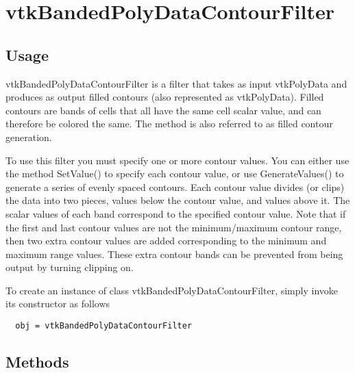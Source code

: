 \section{vtkBandedPolyDataContourFilter}

\subsection{Usage}

 vtkBandedPolyDataContourFilter is a filter that takes as input vtkPolyData
 and produces as output filled contours (also represented as vtkPolyData).
 Filled contours are bands of cells that all have the same cell scalar
 value, and can therefore be colored the same. The method is also referred
 to as filled contour generation.

 To use this filter you must specify one or more contour values.  You can
 either use the method SetValue() to specify each contour value, or use
 GenerateValues() to generate a series of evenly spaced contours.  Each
 contour value divides (or clips) the data into two pieces, values below
 the contour value, and values above it. The scalar values of each
 band correspond to the specified contour value.  Note that if the first and
 last contour values are not the minimum/maximum contour range, then two
 extra contour values are added corresponding to the minimum and maximum
 range values. These extra contour bands can be prevented from being output
 by turning clipping on.


To create an instance of class vtkBandedPolyDataContourFilter, simply
invoke its constructor as follows
\begin{verbatim}
  obj = vtkBandedPolyDataContourFilter
\end{verbatim}
\subsection{Methods}

